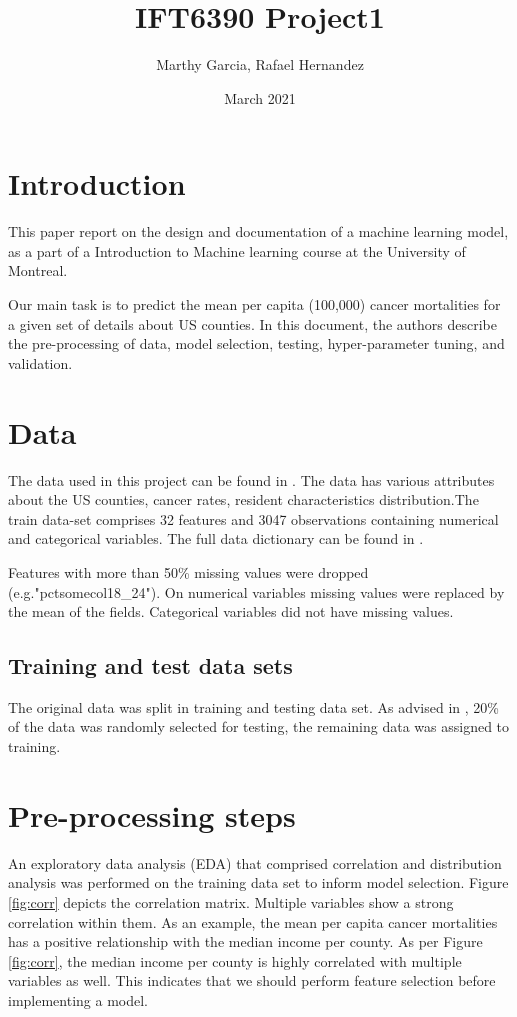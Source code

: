 \documentclass[twocolumn]{article}
\title{IFT6390 Project1}
\author{Marthy Garcia, Rafael Hernandez}
\date{March 2021}
\begin{document}
\maketitle

\section{Introduction}
This paper report on the design and documentation of a machine learning model, as a part of a Introduction to Machine learning course at the University of Montreal. 

Our main task is to predict the mean per capita (100,000) cancer mortalities for a given set of details about US counties. In this document, the authors describe the pre-processing of data, model selection, testing, hyper-parameter tuning, and validation.

\section{Data } \label{secData}

The data used in this project can be found in \cite{bibdata}. The data has various attributes about the US counties, cancer rates, resident characteristics distribution.The train data-set comprises 32 features and 3047 observations containing numerical and categorical variables. The full data dictionary can be found in \cite{bibdatadict}.

Features with more than 50\% missing values were dropped (e.g."pctsomecol18\_24"). On numerical variables missing values were replaced by the mean of the fields. Categorical variables did not have missing values.

\subsection{Training and test data sets} \label{secsplit}
The original data was split in training and testing data set. As advised in \cite{bibDangeti2017},  20\% of the data was randomly selected for testing, the remaining data was assigned to training.

\section{Pre-processing steps} \label{secpre}
An exploratory data analysis (EDA) that comprised correlation and distribution analysis was performed on the training data set to inform model selection. Figure \ref{fig:corr} depicts the correlation matrix. Multiple variables show a strong correlation within them. As an example, the mean per capita cancer mortalities has a positive relationship with the median income per county. As per Figure \ref{fig:corr}, the median income per county is highly correlated with multiple variables as well. This indicates that we should perform feature selection before implementing a model.
\end{document}
